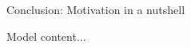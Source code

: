 \documentclass[11pt,aspectratio=169]{beamer}
\newcommand{\ar}{$\Rightarrow$ \ }
\begin{document}
\begin{frame}{Conclusion: Motivation in a nutshell}
\end{frame}



\begin{frame}{Model}
	content...
\end{frame}
\end{document}
